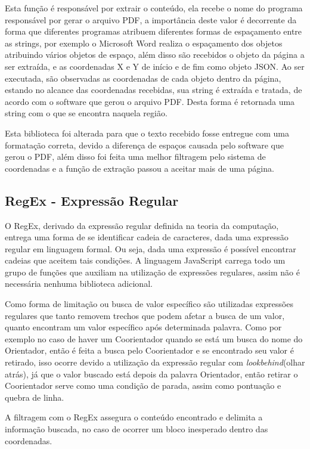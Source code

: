 Esta função é responsável por extrair o conteúdo, ela recebe o nome do programa responsável por gerar o arquivo PDF, a importância deste valor é decorrente da forma que diferentes programas atribuem diferentes formas de espaçamento entre as strings, por exemplo o Microsoft Word realiza o espaçamento dos objetos atribuindo vários objetos de espaço, além disso são recebidos o objeto da página a ser extraída, e as coordenadas X e Y de início e de fim como objeto JSON. Ao ser executada, são observadas as coordenadas de cada objeto dentro da página, estando no alcance das coordenadas recebidas, sua string é extraída e tratada, de acordo com o software que gerou o arquivo PDF. Desta forma é retornada uma string com o que se encontra naquela região.

Esta biblioteca foi alterada para que o texto recebido fosse entregue com uma formatação correta, devido a diferença de espaços causada pelo software que gerou o PDF, além disso foi feita uma melhor filtragem pelo sistema de coordenadas e a função de extração passou a aceitar mais de uma página.

\subsection{RegEx - Expressão Regular}
O RegEx, derivado da expressão regular definida na teoria da computação, entrega uma forma de se identificar cadeia de caracteres, dada uma expressão regular em linguagem formal. Ou seja, dada uma expressão é possível encontrar cadeias que aceitem tais condições. A linguagem JavaScript carrega todo um grupo de funções que auxiliam na utilização de expressões regulares, assim não é necessária nenhuma biblioteca adicional.

Como forma de limitação ou busca de valor específico são utilizadas expressões regulares que tanto removem trechos que podem afetar a busca de um valor, quanto encontram um valor específico após determinada palavra. Como por exemplo no caso de haver um Coorientador quando se está um busca do nome do Orientador, então é feita a busca pelo Coorientador e se encontrado seu valor é retirado, isso ocorre devido a utilização da expressão regular com \textit{lookbehind}(olhar atrás), já que o valor buscado está depois da palavra Orientador, então retirar o Coorientador serve como uma condição de parada, assim como pontuação e quebra de linha.

A filtragem com o RegEx assegura o conteúdo encontrado e delimita a informação buscada, no caso de ocorrer um bloco inesperado dentro das coordenadas. 

